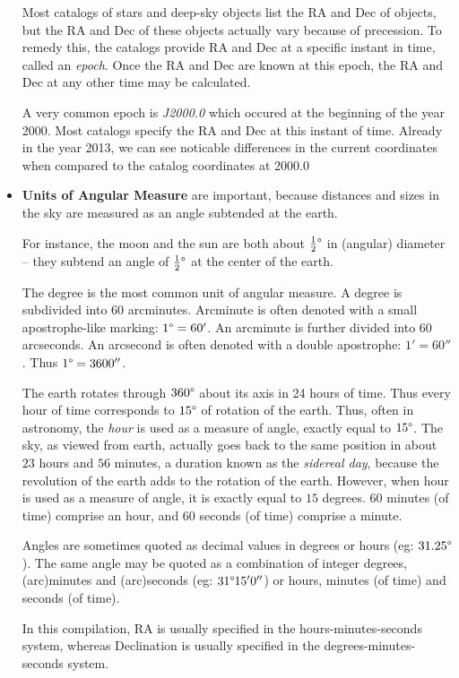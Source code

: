 \begin{itemize}
  Most catalogs of stars and deep-sky objects list the RA and Dec of
  objects, but the RA and Dec of these objects actually vary because
  of precession. To remedy this, the catalogs provide RA and Dec at a
  specific instant in time, called an \emph{epoch}. Once the RA and
  Dec are known at this epoch, the RA and Dec at any other time may be
  calculated.

  A very common epoch is \emph{J2000.0} which occured at the beginning
  of the year 2000. Most catalogs specify the RA and Dec at this
  instant of time. Already in the year 2013, we can see noticable
  differences in the current coordinates when compared to the catalog
  coordinates at 2000.0

\item \textbf{Units of Angular Measure} are important, because
  distances and sizes in the sky are measured as an angle subtended at
  the earth.

  For instance, the moon and the sun are both about $\frac{1}{2}
  \degree$ in (angular) diameter -- they subtend an angle of
  $\frac{1}{2} \degree$ at the center of the earth.

  The degree is the most common unit of angular measure. A degree is
  subdivided into $60$ arcminutes. Arcminute is often denoted with a
  small apostrophe-like marking: $1 \degree = 60'$. An arcminute is
  further divided into $60$ arcseconds. An arcsecond is often denoted
  with a double apostrophe: $1' = 60''$. Thus $1\degree = 3600''$.

  The earth rotates through $360\degree$ about its axis in 24 hours of
  time. Thus every hour of time corresponds to $15\degree$ of rotation
  of the earth. Thus, often in astronomy, the \emph{hour} is used as a
  measure of angle, exactly equal to $15\degree$. The sky, as viewed
  from earth, actually goes back to the same position in about $23$
  hours and $56$ minutes, a duration known as the \emph{sidereal day},
  because the revolution of the earth adds to the rotation of the
  earth. However, when hour is used as a measure of angle, it is
  exactly equal to $15$ degrees. 60 minutes (of time) comprise an
  hour, and 60 seconds (of time) comprise a minute.

  Angles are sometimes quoted as decimal values in degrees or hours
  (eg: $31.25\degree$). The same angle may be quoted as a combination
  of integer degrees, (arc)minutes and (arc)seconds (eg: $31\degree
  15' 0''$) or hours, minutes (of time) and seconds (of time).

  In this compilation, RA is usually specified in the
  hours-minutes-seconds system, whereas Declination is usually
  specified in the degrees-minutes-seconds system.


\end{itemize}
